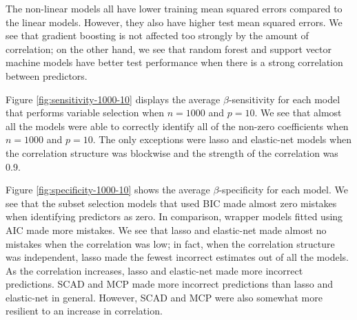 \documentclass{article}
\begin{document}
The non-linear models all have lower training mean squared errors compared to the linear models. However, they also have higher test mean squared errors. We see that gradient boosting is not affected too strongly by the amount of correlation; on the other hand, we see that random forest and support vector machine models have better test performance when there is a strong correlation between predictors.

Figure \ref{fig:sensitivity-1000-10} displays the average $\beta$-sensitivity for each model that performs variable selection when $n = 1000$ and $p = 10$. We see that almost all the models were able to correctly identify all of the non-zero coefficients when $n = 1000$ and $p = 10$. The only exceptions were lasso and elastic-net models when the correlation structure was blockwise and the strength of the correlation was 0.9.

Figure \ref{fig:specificity-1000-10} shows the average $\beta$-specificity for each model. We see that the subset selection models that used BIC made almost zero mistakes when identifying predictors as zero. In comparison, wrapper models fitted using AIC made more mistakes. We see that lasso and elastic-net made almost no mistakes when the correlation was low; in fact, when the correlation structure was independent, lasso made the fewest incorrect estimates out of all the models. As the correlation increases, lasso and elastic-net made more incorrect predictions. SCAD and MCP made more incorrect predictions than lasso and elastic-net in general. However, SCAD and MCP were also somewhat more resilient to an increase in correlation.
\end{document}
